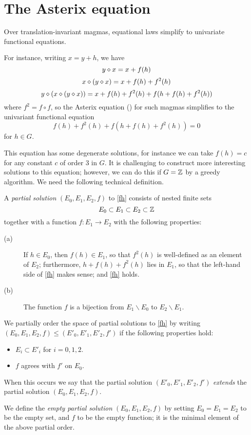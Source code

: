 \section{The Asterix equation}\label{asterix-section}

Over translation-invariant magmas, equational laws simplify to univariate functional equations.

For instance, writing $x = y+h$, we have
$$ y \diamond x = x + f(h)$$
$$ x \diamond (y \diamond x) = x + f(h) + f^2(h)$$
$$ y \diamond (x \diamond (y \diamond x)) = x + f(h) + f^2(h) + f( h + f(h) + f^2(h) )$$
where $f^2 = f \circ f$, so the Asterix equation () for such magmas simplifies to the univariant functional equation
\begin{equation}\label{fh}
   f(h) + f^2(h) + f( h + f(h) + f^2(h) ) = 0
\end{equation}
for $h \in G$.

This equation has some degenerate solutions, for instance we can take $f(h) = c$ for any constant $c$ of order $3$ in $G$.  It is challenging to construct more interesting solutions to this equation; however, we can do this if $G=\mathbb{Z}$ by a greedy algorithm.  We need the following technical definition.

\begin{definition}\label{partial-solution}  A \emph{partial solution} $(E_0, E_1, E_2, f)$ to \eqref{fh} consists of nested finite sets
$$ E_0 \subset E_1 \subset E_2 \subset \mathbb{Z}$$ together with a function $f: E_1 \to E_2$ with the following properties:
\begin{description}
  \item[(a)] If $h \in E_0$, then $f(h) \in E_1$, so that $f^2(h)$ is well-defined as an element of $E_2$; furthermore, $h + f(h) + f^2(h)$ lies in $E_1$, so that the left-hand side of \eqref{fh} makes sense; and \eqref{fh} holds.
  \item[(b)] The function $f$ is a bijection from $E_1 \backslash E_0$ to $E_2 \backslash E_1$.
\end{description}

We partially order the space of partial solutions to \eqref{fh} by writing $(E_0, E_1, E_2, f) \leq (E'_0, E'_1, E'_2, f')$ if the following properties hold:
\begin{itemize}
  \item $E_i \subset E'_i$ for $i=0,1,2$.
  \item $f$ agrees with $f'$ on $E_0$.
\end{itemize}
When this occurs we say that the partial solution $(E'_0, E'_1, E'_2, f')$ \emph{extends} the partial solution $(E_0, E_1, E_2, f)$.

We define the \emph{empty partial solution} $(E_0,E_1,E_2,f)$ by setting $E_0=E_1=E_2$ to be the empty set, and $f$ to be the empty function; it is the minimal element of the above partial order.
\end{definition}


